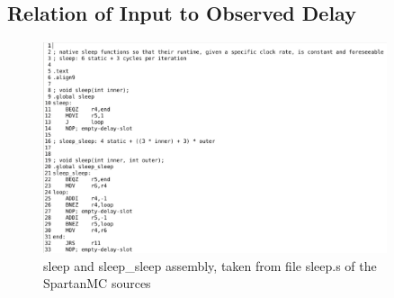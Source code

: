 		\subsection{Relation of Input to Observed Delay} %
		\label{sub:relation_of_input_to_observed_delay}
			\begin{figure}[!htb]
				\centering
					\includegraphics[width=0.9\textwidth]{images/sleep_asm.jpg}
				\caption{sleep and sleep\_sleep assembly, taken from file sleep.s of the SpartanMC sources}
				\label{fig:sleep_asm}
			\end{figure}

